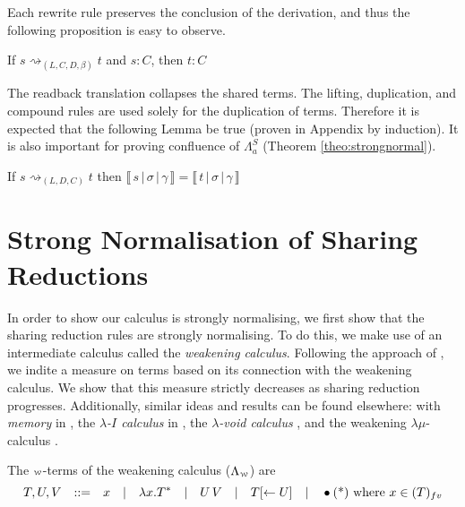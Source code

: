 \documentclass[a4paper,UKenglish,cleveref, autoref]{lipics-v2019}
\newcommand{\FALC}{\Lambda^{S}_{a}}
\newcommand{\WEAK}{\Lambda_{\weaksymbol}}
\newcommand{\fv}[1]{(#1)_{fv}}
\newcommand{\abs}[2]{\lambda #1 . #2}
\newcommand{\app}[2]{#1 \, #2}
\newcommand{\share}[3]{#1 [#2 \leftarrow #3]}
\newcommand{\weaksymbol}{\mbox{\tiny $\mathcal{W}$}}
\newcommand{\readbackwmap}[3]{\llbracket \, #1 \, \vert \, #2 \, \vert \, #3  \, \rrbracket }
\begin{document}
Each rewrite rule preserves the conclusion of the derivation, and thus the following proposition is easy to observe.

\begin{proposition}
If $s \rightsquigarrow_{(L, C, D, \beta)} t$ and $s : C$, then $t : C$
\end{proposition}

\noindent The readback translation collapses the shared terms. The lifting, duplication, and compound rules are used solely for the duplication of terms. Therefore it is expected that the following Lemma be true (proven in Appendix by induction). It is also important for proving confluence of $\FALC$ (Theorem \ref{theo:strongnormal}).

\begin{lemma}
\label{lem:preservesdenotation}
 If $s \rightsquigarrow_{(L, D, C)} t$ then $\readbackwmap{s}{\sigma}{\gamma} = \readbackwmap{t}{\sigma}{\gamma}$
\end{lemma}

\section{Strong Normalisation of Sharing Reductions}
\label{chap:snosr}

In order to show our calculus is strongly normalising, we first show that the sharing reduction rules are strongly normalising. To do this, we make use of an intermediate calculus called the \emph{weakening calculus}. Following the approach of \cite{Gundersen-Heijltjes-Parigot-2013-LICS}, we indite a measure on terms based on its connection with the weakening calculus. We show that this measure strictly decreases as sharing reduction progresses. Additionally, similar ideas and results can be found elsewhere: with \emph{memory} in \cite{Klop-1980}, the \emph{$\lambda$-$I$ calculus} in \cite{Barendregt-1984}, the \emph{$\lambda$-void calculus} \cite{Accattoli-Kesner-2012}, and the weakening $\lambda\mu$-calculus \cite{He-2018}.


\begin{definition}
\label{def:weakterms}
The $\weaksymbol$-terms of the weakening calculus ($\WEAK$) are
\begin{equation*}
	T, U, V \quad {:}{:}{=} \quad x \quad \vert \quad \abs{x}{T^{*}}\quad \vert \quad \app{U}{V} \quad \vert \quad \share{T}{}{U} \quad \vert \quad \bullet \hfill \text{(*) where $x \in \fv{T}$}
\end{equation*}
\end{definition}
\end{document}
